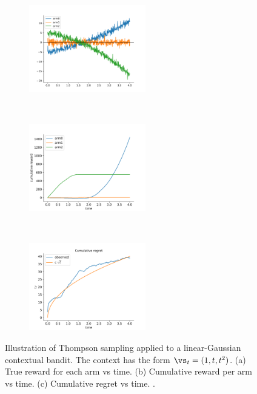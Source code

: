 \begin{figure}
\centering
\begin{subfigure}[b]{0.3\textwidth}
\centering
\includegraphics[height=1.5in]{figs/bandit-lingauss-true-reward}
\caption{ }
\end{subfigure}
~
\begin{subfigure}[b]{0.3\textwidth}
  \centering
  \includegraphics[height=1.5in]{figs/bandit-lingauss-cumulative-reward}
\caption{ }
\end{subfigure}
~
\begin{subfigure}[b]{0.3\textwidth}
  \centering
    \includegraphics[height=1.5in]{figs/bandit-lingauss-cumulative-regret}
\caption{ }
\end{subfigure}
\caption{
  Illustration of Thompson sampling applied to a linear-Gaussian
  contextual bandit. The context has the form $\vs_t =(1,t,t^2)$.
  (a) True reward for each arm vs time.
  (b) Cumulative reward per arm vs time.
  (c) Cumulative regret vs time.
  .
}
\label{fig:banditsLingauss}
\end{figure}

